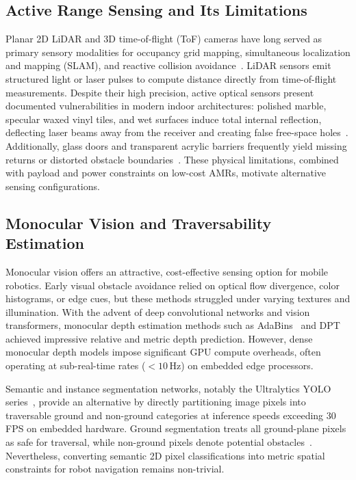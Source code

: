\documentclass[preprint,12pt]{elsarticle}
\begin{document}
\subsection{Active Range Sensing and Its Limitations}
Planar 2D LiDAR and 3D time-of-flight (ToF) cameras have long served as primary sensory modalities for occupancy grid mapping, simultaneous localization and mapping (SLAM), and reactive collision avoidance~\cite{li_2020_lidar,thrun_2010_probabilistic,elfes_1989_using}. LiDAR sensors emit structured light or laser pulses to compute distance directly from time-of-flight measurements. Despite their high precision, active optical sensors present documented vulnerabilities in modern indoor architectures: polished marble, specular waxed vinyl tiles, and wet surfaces induce total internal reflection, deflecting laser beams away from the receiver and creating false free-space holes~\cite{deepthadamodaran_2023_experimental,yang_2011_on}. Additionally, glass doors and transparent acrylic barriers frequently yield missing returns or distorted obstacle boundaries~\cite{tibebu_2021_lidarbased,wang_2017_detecting}. These physical limitations, combined with payload and power constraints on low-cost AMRs, motivate alternative sensing configurations.

\subsection{Monocular Vision and Traversability Estimation}
Monocular vision offers an attractive, cost-effective sensing option for mobile robotics. Early visual obstacle avoidance relied on optical flow divergence, color histograms, or edge cues, but these methods struggled under varying textures and illumination. With the advent of deep convolutional networks and vision transformers, monocular depth estimation methods such as AdaBins~\cite{shariqfarooqbhat_2021_adabins} and DPT~\cite{ranftl_2021_vision} achieved impressive relative and metric depth prediction. However, dense monocular depth models impose significant GPU compute overheads, often operating at sub-real-time rates ($<10$\,Hz) on embedded edge processors.

Semantic and instance segmentation networks, notably the Ultralytics YOLO series~\cite{ultralytics_2024_ultralytics}, provide an alternative by directly partitioning image pixels into traversable ground and non-ground categories at inference speeds exceeding 30\,FPS on embedded hardware. Ground segmentation treats all ground-plane pixels as safe for traversal, while non-ground pixels denote potential obstacles~\cite{wang_2021_a,dang_2023_obstacle}. Nevertheless, converting semantic 2D pixel classifications into metric spatial constraints for robot navigation remains non-trivial.
\end{document}
